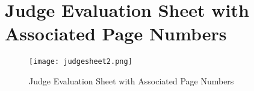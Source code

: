 \section{Judge Evaluation Sheet with Associated Page Numbers}
\begin{figure}[H]
    \centering
    \texttt{[image: judgesheet2.png]}
    \caption{Judge Evaluation Sheet with Associated Page Numbers}
  \end{figure}

